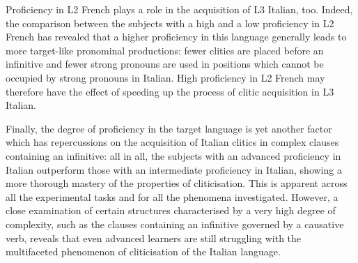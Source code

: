 \documentclass[output=paper,modfonts,nonflat,newtxmath]{langsci/langscibook}
\begin{document}
Proficiency in L2 French plays a role in the acquisition of L3 Italian, too. Indeed, the comparison between the subjects with a high and a low proficiency in L2 French has revealed that a higher proficiency in this language generally leads to more target-like pronominal productions: fewer clitics are placed before an infinitive and fewer strong pronouns are used in positions which cannot be occupied by strong pronouns in Italian. High proficiency in L2 French may therefore have the effect of speeding up the process of clitic acquisition in L3 Italian.

Finally, the degree of proficiency in the target language is yet another factor which has repercussions on the acquisition of Italian clitics in complex clauses containing an infinitive: all in all, the subjects with an advanced proficiency in Italian outperform those with an intermediate proficiency in Italian, showing a more thorough mastery of the properties of cliticisation. This is apparent across all the experimental tasks and for all the phenomena investigated. However, a close examination of certain structures characterised by a very high degree of complexity, such as the clauses containing an infinitive governed by a causative verb, reveals that even advanced learners are still struggling with the multifaceted phenomenon of cliticisation of the Italian language.

\sloppy\printbibliography[heading=subbibliography,notkeyword=this]
\end{document}
